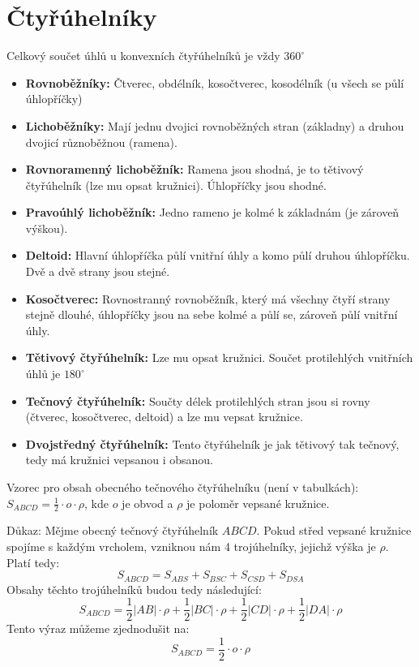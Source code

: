 \documentclass[12pt]{article}
\begin{document}
\section*{Čtyřúhelníky}
Celkový součet úhlů u konvexních čtyřúhelníků je vždy $360^\circ$
\begin{itemize}
    \item \textbf{Rovnoběžníky:} Čtverec, obdélník, kosočtverec, kosodélník (u všech se půlí úhlopříčky)
    \item \textbf{Lichoběžníky:} Mají jednu dvojici rovnoběžných stran (základny) a druhou dvojicí různoběžnou (ramena).
    \item \textbf{Rovnoramenný lichoběžník:} Ramena jsou shodná, je to tětivový čtyřúhelník (lze mu opsat kružnici). Úhlopříčky jsou shodné.
    \item \textbf{Pravoúhlý lichoběžník:} Jedno rameno je kolmé k základnám (je zároveň výškou).
    \item \textbf{Deltoid:} Hlavní úhlopříčka půlí vnitřní úhly a komo půlí druhou úhlopříčku. Dvě a dvě strany jsou stejné.
    \item \textbf{Kosočtverec:} Rovnostranný rovnoběžník, který má všechny čtyří strany stejně dlouhé, úhlopříčky jsou na sebe kolmé a půlí se, zároveň půlí vnitřní úhly.
    \item \textbf{Tětivový čtyřúhelník:} Lze mu opsat kružnici. Součet protilehlých vnitřních úhlů je $180^\circ$
    \item \textbf{Tečnový čtyřúhelník:} Součty délek protilehlých stran jsou si rovny (čtverec, kosočtverec, deltoid) a lze mu vepsat kružnice.
    \item \textbf{Dvojstředný čtyřúhelník:} Tento čtyřúhelník je jak tětivový tak tečnový, tedy má
        kružnici vepsanou i obsanou.
\end{itemize}

Vzorec pro obsah obecného tečnového čtyřúhelníku (není v tabulkách): $S_{ABCD} = \frac{1}{2}\cdot o\cdot\rho$, kde $o$ je obvod a $\rho$ je poloměr vepsané kružnice. 

Důkaz: Mějme obecný tečnový čtyřúhelník $ABCD$. Pokud střed vepsané kružnice spojíme s každým vrcholem, vzniknou nám 4 trojúhelníky, jejichž výška je $\rho$. Platí tedy:
\[S_{ABCD} = S_{ABS} + S_{BSC} + S_{CSD} + S_{DSA}\]
Obsahy těchto trojúhelníků budou tedy následující:
\[S_{ABCD} = \frac{1}{2}|AB|\cdot\rho + \frac{1}{2}|BC|\cdot\rho + \frac{1}{2}|CD|\cdot\rho + \frac{1}{2}|DA|\cdot\rho\]
Tento výraz můžeme zjednodušit na:
\[S_{ABCD} = \frac{1}{2} \cdot o \cdot \rho\] 
\end{document}
